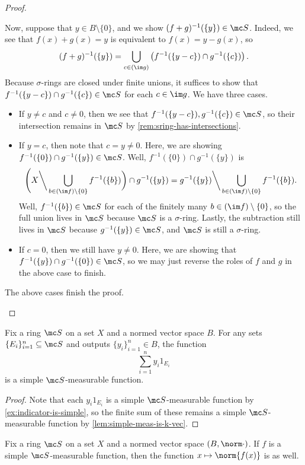 \documentclass[../notes.tex]{subfiles}
\begin{document}
\begin{proof}
\begin{itemize}
		Now, suppose that $y\in B\setminus\{0\}$, and we show $(f+g)^{-1}(\{y\})\in\mc S$. Indeed, we see that $f(x)+g(x)=y$ is equivalent to $f(x)=y-g(x)$, so
		\[(f+g)^{-1}(\{y\})=\bigcup_{c\in(\im g)}\left(f^{-1}(\{y-c\})\cap g^{-1}(\{c\})\right).\]
		Because $\sigma$-rings are closed under finite unions, it suffices to show that $f^{-1}(\{y-c\})\cap g^{-1}(\{c\})\in\mc S$ for each $c\in\im g$. We have three cases.
		\begin{itemize}
			\item If $y\ne c$ and $c\ne0$, then we see that $f^{-1}(\{y-c\}),g^{-1}(\{c\})\in\mc S$, so their intersection remains in $\mc S$ by \autoref{rem:sring-has-intersections}.
			\item If $y=c$, then note that $c=y\ne0$. Here, we are showing $f^{-1}(\{0\})\cap g^{-1}(\{y\})\in\mc S$. Well, $f^{-1}(\{0\})\cap g^{-1}(\{y\})$ is
			\[\Bigg(X{\mathbin\bigg\backslash}\bigcup_{b\in(\im f)\setminus\{0\}}f^{-1}(\{b\})\bigg)\cap g^{-1}(\{y\})=g^{-1}(\{y\}){\mathbin\bigg\backslash}\bigcup_{b\in(\im f)\setminus\{0\}}f^{-1}(\{b\}).\]
			Well, $f^{-1}(\{b\})\in\mc S$ for each of the finitely many $b\in(\im f)\setminus\{0\}$, so the full union lives in $\mc S$ because $\mc S$ is a $\sigma$-ring. Lastly, the subtraction still lives in $\mc S$ because $g^{-1}(\{y\})\in\mc S$, and $\mc S$ is still a $\sigma$-ring.
			\item If $c=0$, then we still have $y\ne0$. Here, we are showing that $f^{-1}(\{y\})\cap g^{-1}(\{0\})\in\mc S$, so we may just reverse the roles of $f$ and $g$ in the above case to finish.
		\end{itemize}
		The above cases finish the proof.
		\qedhere
	\end{itemize}
\end{proof}
\begin{corollary}
	Fix a ring $\mc S$ on a set $X$ and a normed vector space $B$. For any sets $\{E_i\}_{i=1}^n\subseteq\mc S$ and outputs $\{y_i\}_{i=1}^n\in B$, the function
	\[\sum_{i=1}^ny_i1_{E_i}\]
	is a simple $\mc S$-measurable function.
\end{corollary}
\begin{proof}
	Note that each $y_i1_{E_i}$ is a simple $\mc S$-measurable function by \autoref{ex:indicator-is-simple}, so the finite sum of these remains a simple $\mc S$-measurable function by \autoref{lem:simple-meas-is-k-vec}.
\end{proof}
\begin{lemma} \label{lem:norm-is-simple-meas}
	Fix a ring $\mc S$ on a set $X$ and a normed vector space $(B,\norm\cdot)$. If $f$ is a simple $\mc S$-measurable function, then the function $x\mapsto\norm{f(x)}$ is as well.
\end{lemma}
\end{document}
